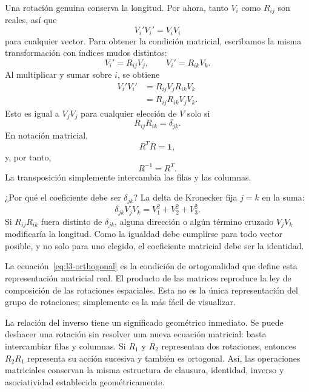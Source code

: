 Una rotación genuina conserva la longitud. Por ahora, tanto \(V_i\) como \(R_{ij}\) son reales, así que
\begin{equation}
V_i'V_i'=V_iV_i
\end{equation}
para cualquier vector. Para obtener la condición matricial, escribamos la misma transformación con índices mudos distintos:
\begin{equation}
V_i'=R_{ij}V_j,\qquad V_i'=R_{ik}V_k.
\end{equation}
Al multiplicar y sumar sobre \(i\), se obtiene
\begin{align}
V_i'V_i'
 &=R_{ij}V_jR_{ik}V_k\\
 &=R_{ij}R_{ik}V_jV_k.
\end{align}
Esto es igual a \(V_jV_j\) para cualquier elección de \(V\) solo si
\begin{equation}
R_{ij}R_{ik}=\delta_{jk}.
\label{eq:l3-orthogonality-index}
\end{equation}
En notación matricial,
\begin{equation}
R^TR=\boldsymbol 1,
\label{eq:l3-orthogonal}
\end{equation}
y, por tanto,
\begin{equation}
R^{-1}=R^T.
\end{equation}
La transposición simplemente intercambia las filas y las columnas.

¿Por qué el coeficiente debe ser \(\delta_{jk}\)? La delta de Kronecker fija \(j=k\) en la suma:
\begin{equation}
\delta_{jk}V_jV_k=V_1^2+V_2^2+V_3^2.
\end{equation}
Si \(R_{ij}R_{ik}\) fuera distinto de \(\delta_{jk}\), alguna dirección o algún término cruzado \(V_jV_k\) modificaría la longitud. Como la igualdad debe cumplirse para todo vector posible, y no solo para uno elegido, el coeficiente matricial debe ser la identidad.

La ecuación~\eqref{eq:l3-orthogonal} es la condición de ortogonalidad que define esta representación matricial real. El producto de las matrices reproduce la ley de composición de las rotaciones espaciales. Esta no es la única representación del grupo de rotaciones; simplemente es la más fácil de visualizar.

La relación del inverso tiene un significado geométrico inmediato. Se puede deshacer una rotación sin resolver una nueva ecuación matricial: basta intercambiar filas y columnas. Si \(R_1\) y \(R_2\) representan dos rotaciones, entonces \(R_2R_1\) representa su acción sucesiva y también es ortogonal. Así, las operaciones matriciales conservan la misma estructura de clausura, identidad, inverso y asociatividad establecida geométricamente.

